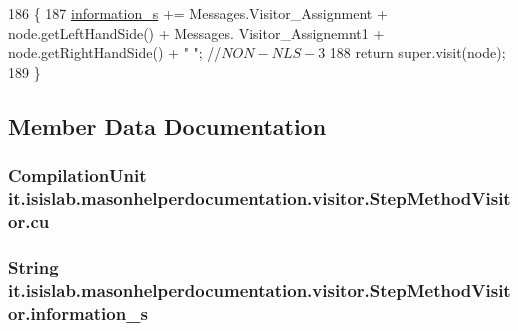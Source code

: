 \begin{DoxyCode}
186                                          \{
187         \hyperlink{classit_1_1isislab_1_1masonhelperdocumentation_1_1visitor_1_1_step_method_visitor_adf58f8f5068e330783c3c4bd78080f1a}{information\_s} += Messages.Visitor\_Assignment + node.getLeftHandSide() + Messages.
      Visitor\_Assignemnt1 + node.getRightHandSide() + \textcolor{stringliteral}{" "}; \textcolor{comment}{//$NON-NLS-3$}
188         \textcolor{keywordflow}{return} super.visit(node);
189     \}
\end{DoxyCode}


\subsection{Member Data Documentation}
\hypertarget{classit_1_1isislab_1_1masonhelperdocumentation_1_1visitor_1_1_step_method_visitor_a2e892060825ccd1ba2382eb96b6d187a}{
\subsubsection[{cu}]{\setlength{\rightskip}{0pt plus 5cm}Compilation\-Unit it.\-isislab.\-masonhelperdocumentation.\-visitor.\-Step\-Method\-Visitor.\-cu\hspace{0.3cm}{\ttfamily [private]}}}\label{classit_1_1isislab_1_1masonhelperdocumentation_1_1visitor_1_1_step_method_visitor_a2e892060825ccd1ba2382eb96b6d187a}
\hypertarget{classit_1_1isislab_1_1masonhelperdocumentation_1_1visitor_1_1_step_method_visitor_adf58f8f5068e330783c3c4bd78080f1a}{
\subsubsection[{information\-\_\-s}]{\setlength{\rightskip}{0pt plus 5cm}String it.\-isislab.\-masonhelperdocumentation.\-visitor.\-Step\-Method\-Visitor.\-information\-\_\-s\hspace{0.3cm}{\ttfamily [private]}}}\label{classit_1_1isislab_1_1masonhelperdocumentation_1_1visitor_1_1_step_method_visitor_adf58f8f5068e330783c3c4bd78080f1a}
